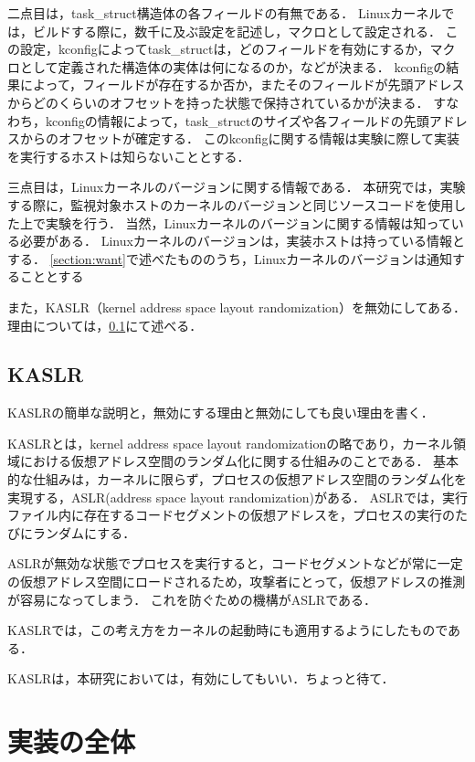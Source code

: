 二点目は，task_struct構造体の各フィールドの有無である．
Linuxカーネルでは，ビルドする際に，数千に及ぶ設定を記述し，マクロとして設定される．
この設定，kconfigによってtask_structは，どのフィールドを有効にするか，マクロとして定義された構造体の実体は何になるのか，などが決まる．
kconfigの結果によって，フィールドが存在するか否か，またそのフィールドが先頭アドレスからどのくらいのオフセットを持った状態で保持されているかが決まる．
すなわち，kconfigの情報によって，task_structのサイズや各フィールドの先頭アドレスからのオフセットが確定する．
このkconfigに関する情報は実験に際して実装を実行するホストは知らないこととする．

三点目は，Linuxカーネルのバージョンに関する情報である．
本研究では，実験する際に，監視対象ホストのカーネルのバージョンと同じソースコードを使用した上で実験を行う．
当然，Linuxカーネルのバージョンに関する情報は知っている必要がある．
Linuxカーネルのバージョンは，実装ホストは持っている情報とする．
\ref{section:want}で述べたもののうち，Linuxカーネルのバージョンは通知することとする

また，KASLR（kernel address space layout randomization）を無効にしてある．理由については，\ref{subsection:kaslr}にて述べる．

\subsection{KASLR}
\label{subsection:kaslr}

KASLRの簡単な説明と，無効にする理由と無効にしても良い理由を書く．

KASLRとは，kernel address space layout randomizationの略であり，カーネル領域における仮想アドレス空間のランダム化に関する仕組みのことである．
基本的な仕組みは，カーネルに限らず，プロセスの仮想アドレス空間のランダム化を実現する，ASLR(address space layout randomization)がある．
ASLRでは，実行ファイル内に存在するコードセグメントの仮想アドレスを，プロセスの実行のたびにランダムにする．

ASLRが無効な状態でプロセスを実行すると，コードセグメントなどが常に一定の仮想アドレス空間にロードされるため，攻撃者にとって，仮想アドレスの推測が容易になってしまう．
これを防ぐための機構がASLRである．

KASLRでは，この考え方をカーネルの起動時にも適用するようにしたものである．


KASLRは，本研究においては，有効にしてもいい．ちょっと待て．

\section{実装の全体}

